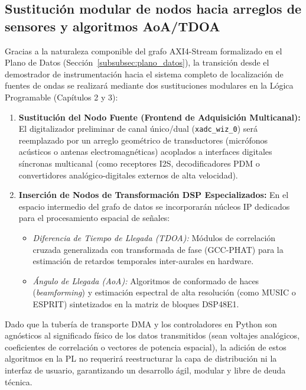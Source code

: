 \documentclass[standalone]{subfiles}
\begin{document}
\subsection{Sustitución modular de nodos hacia arreglos de sensores y algoritmos AoA/TDOA}
\label{subsec:sustitucion_modular_aoa_tdoa}

Gracias a la naturaleza componible del grafo AXI4-Stream formalizado en el Plano de Datos (Sección~\ref{subsubsec:plano_datos}), la transición desde el demostrador de instrumentación hacia el sistema completo de localización de fuentes de ondas se realizará mediante dos sustituciones modulares en la Lógica Programable (Capítulos 2 y 3):

\begin{enumerate}
    \item \textbf{Sustitución del Nodo Fuente (Frontend de Adquisición Multicanal):} El digitalizador preliminar de canal único/dual (\texttt{xadc\_wiz\_0}) será reemplazado por un arreglo geométrico de transductores (micrófonos acústicos o antenas electromagnéticas) acoplados a interfaces digitales síncronas multicanal (como receptores I2S, decodificadores PDM o convertidores analógico-digitales externos de alta velocidad).
    
    \item \textbf{Inserción de Nodos de Transformación DSP Especializados:} En el espacio intermedio del grafo de datos se incorporarán núcleos IP dedicados para el procesamiento espacial de señales:
    \begin{itemize}
        \item \textit{Diferencia de Tiempo de Llegada (TDOA):} Módulos de correlación cruzada generalizada con transformada de fase (GCC-PHAT) para la estimación de retardos temporales inter-aurales en hardware.
        \item \textit{Ángulo de Llegada (AoA):} Algoritmos de conformado de haces (\textit{beamforming}) y estimación espectral de alta resolución (como MUSIC o ESPRIT) sintetizados en la matriz de bloques DSP48E1.
    \end{itemize}
\end{enumerate}

Dado que la tubería de transporte DMA y los controladores en Python son agnósticos al significado físico de los datos transmitidos (sean voltajes analógicos, coeficientes de correlación o vectores de potencia espacial), la adición de estos algoritmos en la PL no requerirá reestructurar la capa de distribución ni la interfaz de usuario, garantizando un desarrollo ágil, modular y libre de deuda técnica.
\end{document}
